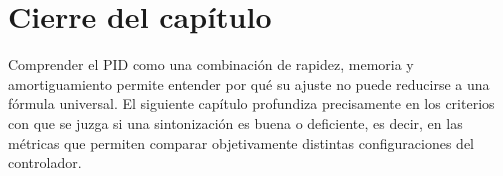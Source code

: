 \section{Cierre del capítulo}
Comprender el PID como una combinación de rapidez, memoria y amortiguamiento permite
entender por qué su ajuste no puede reducirse a una fórmula universal. El siguiente capítulo
profundiza precisamente en los criterios con que se juzga si una sintonización es buena o
deficiente, es decir, en las métricas que permiten comparar objetivamente distintas
configuraciones del controlador.
